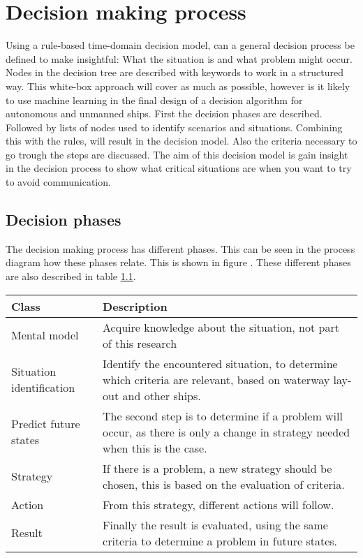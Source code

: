 \chapter{Decision making process}
\label{ch:decision-process}
Using a rule-based time-domain decision model, can a general decision process be defined to make insightful: What the situation is and what problem might occur. Nodes in the decision tree are described with keywords to work in a structured way. This white-box approach will cover as much as possible, however is it likely to use machine learning in the final design of a decision algorithm for autonomous and unmanned ships. First the decision phases are described. Followed by lists of nodes used to identify scenarios and situations. Combining this with the rules, will result in the decision model. Also the criteria necessary to go trough the steps are discussed. The aim of this decision model is gain insight in the decision process to show what critical situations are when you want to try to avoid communication.

\section{Decision phases}
The decision making process has different phases. This can be seen in the process diagram how these phases relate. This is shown in figure . These different phases are also described in table \ref{tab:phases-description}.
\begin{table}[H]
	\begin{tabular}{p{}|p{}}
		\toprule
		Class & Description\\
		\midrule
		Mental model & Acquire knowledge about the situation, not part of this research \\
		Situation identification & Identify the encountered situation, to determine which criteria are relevant, based on waterway lay-out and other ships. \\
		Predict future states & The second step is to determine if a problem will occur, as there is only a change in strategy needed when this is the case. \\
		Strategy & If there is a problem, a new strategy should be chosen, this is based on the evaluation of criteria. \\
		Action & From this strategy, different actions will follow. \\
		Result & Finally the result is evaluated, using the same criteria to determine a problem in future states. \\
		\bottomrule
	\end{tabular}
	
	\label{tab:phases-description}
\end{table}

